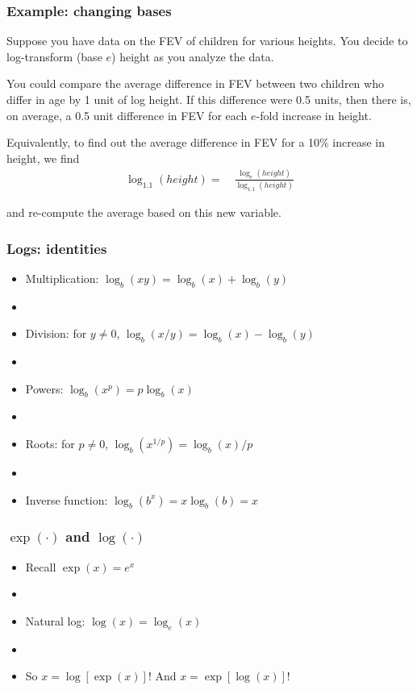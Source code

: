 \documentclass[11pt]{beamer}
\newcommand{\myframe}[1]{\begin{frame} \frametitle{#1}}
\begin{document}
\begin{frame}
\frametitle{Example: changing bases}
Suppose you have data on the FEV of children for various heights. You decide to log-transform (base $e$) height as you analyze the data. \pause

You could compare the average difference in FEV between two children who differ in age by 1 unit of log height. If this difference were 0.5 units, then there is, on average, a 0.5 unit difference in FEV for each $e$-fold increase in height. \pause

Equivalently, to find out the average difference in FEV for a 10\% increase in height, we find \vspace{-0.3cm}
\begin{align*}
\log_{1.1}(height) =& \ \frac{\log_e(height)}{\log_{1.1}(height)}
\end{align*}

and re-compute the average based on this new variable.

\end{frame}

\myframe{Logs: identities}
\begin{itemize}
\item Multiplication: $\log_b(xy) = \log_b(x) + \log_b(y)$
\item[] \pause
\item Division: for $y \neq 0$, $\log_b(x/y) = \log_b(x) - \log_b(y)$
\item[] \pause
\item Powers: $\log_b(x^p) = p \log_b(x)$
\item[] \pause
\item Roots: for $p \neq 0$, $\log_b(x^{1/p}) = \log_b(x)/p$
\item[] \pause
\item Inverse function: $\log_b(b^x) = x\log_b(b) = x$
\end{itemize}
\end{frame}

\myframe{$\exp(\cdot)$ and $\log(\cdot)$}
\begin{itemize}
\item Recall $\exp(x) = e^x$
\item[] \pause
\item Natural log: $\log (x) = \log_e(x)$
\item[] \pause
\item So $x = \log [\exp(x)]$! And $x = \exp[\log(x)]$!
\end{itemize}
\end{frame}
\end{document}
